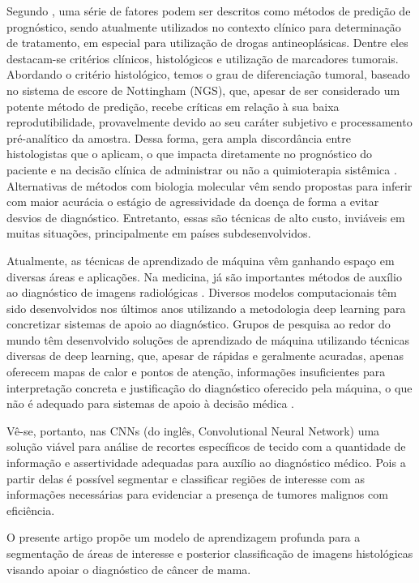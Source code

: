 \documentclass[12pt]{article}
\begin{document}
Segundo , uma série de fatores podem ser descritos como métodos de predição de prognóstico, sendo atualmente utilizados no contexto clínico para determinação de tratamento, em especial para utilização de drogas antineoplásicas. Dentre eles destacam-se critérios clínicos, histológicos e utilização de marcadores tumorais. Abordando o critério histológico, temos o grau de diferenciação tumoral, baseado no sistema de escore de Nottingham (NGS), que, apesar de ser considerado um potente método de predição, recebe críticas em relação à sua baixa reprodutibilidade, provavelmente devido ao seu caráter subjetivo e processamento pré-analítico da amostra. Dessa forma, gera ampla discordância entre histologistas que o aplicam, o que impacta diretamente no prognóstico do paciente e na decisão clínica de administrar ou não a quimioterapia sistêmica \cite{tiezzi2020}.
Alternativas de métodos com biologia molecular vêm sendo propostas para inferir com maior acurácia o estágio de agressividade da doença de forma a evitar desvios de diagnóstico. Entretanto, essas são técnicas de alto custo, inviáveis em muitas situações, principalmente em países subdesenvolvidos.

Atualmente, as técnicas de aprendizado de máquina vêm ganhando espaço em diversas áreas e aplicações. Na medicina, já são importantes métodos de auxílio ao diagnóstico de imagens radiológicas \cite{hu2018}. Diversos modelos computacionais têm sido desenvolvidos nos últimos anos utilizando a metodologia deep learning para concretizar sistemas de apoio ao diagnóstico. Grupos de pesquisa ao redor do mundo têm desenvolvido soluções de aprendizado de máquina utilizando técnicas diversas de deep learning, que, apesar de rápidas e geralmente acuradas, apenas oferecem mapas de calor e pontos de atenção, informações insuficientes para interpretação concreta e justificação do diagnóstico oferecido pela máquina, o que não é adequado para sistemas de apoio à decisão médica \cite{li2021}.

Vê-se, portanto, nas CNNs (do inglês, Convolutional Neural Network) uma solução viável para análise de recortes específicos de tecido com a quantidade de informação e assertividade adequadas para auxílio ao diagnóstico médico. Pois a partir delas é possível segmentar e classificar regiões de interesse com as informações necessárias para evidenciar a presença de tumores malignos com eficiência.

O presente artigo propõe um modelo  de aprendizagem profunda para a segmentação de áreas de interesse e posterior classificação de imagens histológicas visando apoiar o diagnóstico de câncer de mama.
\end{document}
